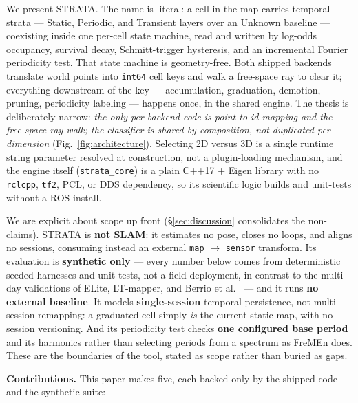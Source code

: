\documentclass[conference]{IEEEtran}
\begin{document}
We present STRATA. The name is literal: a cell in the map carries temporal
strata --- Static, Periodic, and Transient layers over an Unknown baseline ---
coexisting inside one per-cell state machine, read and written by log-odds
occupancy, survival decay, Schmitt-trigger hysteresis, and an incremental
Fourier periodicity test. That state machine is geometry-free. Both shipped
backends translate world points into \texttt{int64} cell keys and walk a free-space
ray to clear it; everything downstream of the key --- accumulation, graduation,
demotion, pruning, periodicity labeling --- happens once, in the shared engine.
The thesis is deliberately narrow: \emph{the only per-backend code is point-to-id
mapping and the free-space ray walk; the classifier is shared by composition,
not duplicated per dimension} (Fig.~\ref{fig:architecture}). Selecting 2D versus 3D is a single
runtime string parameter resolved at construction, not a plugin-loading
mechanism, and the engine itself (\texttt{strata\_core}) is a plain C++17 + Eigen
library with no \texttt{rclcpp}, \texttt{tf2}, PCL, or DDS dependency, so its scientific logic
builds and unit-tests without a ROS install.

We are explicit about scope up front (\S\ref{sec:discussion} consolidates the non-claims). STRATA is
\textbf{not SLAM}: it estimates no pose, closes no loops, and aligns no sessions,
consuming instead an external \texttt{map} $\to$ \texttt{sensor} transform. Its evaluation is
\textbf{synthetic only} --- every number below comes from deterministic seeded
harnesses and unit tests, not a field deployment, in contrast to the multi-day
validations of ELite, LT-mapper, and Berrio et al.\ \cite{berrio2021longterm} ---
and it runs \textbf{no external baseline}. It models \textbf{single-session}
temporal persistence, not multi-session remapping: a graduated cell simply
\emph{is} the current static map, with no session versioning. And its
periodicity test checks \textbf{one configured base period} and its harmonics
rather than selecting periods from a spectrum as FreMEn does.
These are the boundaries of the tool, stated as scope rather than buried as
gaps.

\textbf{Contributions.} This paper makes five, each backed only by the shipped code
and the synthetic suite:
\end{document}

